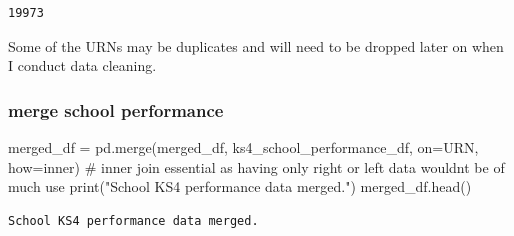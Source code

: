 \documentclass[
  letterpaper,
  DIV=11,
  numbers=noendperiod]{scrartcl}
\newenvironment{Shaded}{\begin{snugshade}}{\end{snugshade}}
\newcommand{\BuiltInTok}[1]{\textcolor[rgb]{0.00,0.23,0.31}{#1}}
\newcommand{\CommentTok}[1]{\textcolor[rgb]{0.37,0.37,0.37}{#1}}
\newcommand{\NormalTok}[1]{\textcolor[rgb]{0.00,0.23,0.31}{#1}}
\newcommand{\OperatorTok}[1]{\textcolor[rgb]{0.37,0.37,0.37}{#1}}
\newcommand{\StringTok}[1]{\textcolor[rgb]{0.13,0.47,0.30}{#1}}
\begin{document}
\begin{verbatim}
19973
\end{verbatim}

Some of the URNs may be duplicates and will need to be dropped later on
when I conduct data cleaning.

\subsubsection{merge school performance}\label{merge-school-performance}

\begin{Shaded}
\begin{Highlighting}[]
\NormalTok{merged\_df }\OperatorTok{=}\NormalTok{ pd.merge(merged\_df, ks4\_school\_performance\_df, on}\OperatorTok{=}\StringTok{\textquotesingle{}URN\textquotesingle{}}\NormalTok{, how}\OperatorTok{=}\StringTok{\textquotesingle{}inner\textquotesingle{}}\NormalTok{)}
\CommentTok{\# inner join essential as having only \textquotesingle{}right\textquotesingle{} or \textquotesingle{}left\textquotesingle{} data wouldnt be of much use}
\BuiltInTok{print}\NormalTok{(}\StringTok{"School KS4 performance data merged."}\NormalTok{)}
\NormalTok{merged\_df.head()}
\end{Highlighting}
\end{Shaded}

\begin{verbatim}
School KS4 performance data merged.
\end{verbatim}
\end{document}
